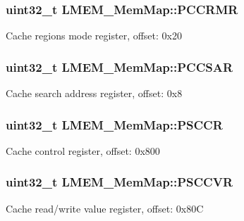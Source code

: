 \subsubsection[{P\+C\+C\+R\+M\+R}]{\setlength{\rightskip}{0pt plus 5cm}uint32\+\_\+t L\+M\+E\+M\+\_\+\+Mem\+Map\+::\+P\+C\+C\+R\+M\+R}\label{struct_l_m_e_m___mem_map_afd9bb5dd96464953c7be37e55627192e}
Cache regions mode register, offset\+: 0x20 \hypertarget{struct_l_m_e_m___mem_map_a2580365cbac4d397893ac168db87fa4d}{}
\subsubsection[{P\+C\+C\+S\+A\+R}]{\setlength{\rightskip}{0pt plus 5cm}uint32\+\_\+t L\+M\+E\+M\+\_\+\+Mem\+Map\+::\+P\+C\+C\+S\+A\+R}\label{struct_l_m_e_m___mem_map_a2580365cbac4d397893ac168db87fa4d}
Cache search address register, offset\+: 0x8 \hypertarget{struct_l_m_e_m___mem_map_ad26f05e85cf69da9518f970a37bf8c39}{}
\subsubsection[{P\+S\+C\+C\+R}]{\setlength{\rightskip}{0pt plus 5cm}uint32\+\_\+t L\+M\+E\+M\+\_\+\+Mem\+Map\+::\+P\+S\+C\+C\+R}\label{struct_l_m_e_m___mem_map_ad26f05e85cf69da9518f970a37bf8c39}
Cache control register, offset\+: 0x800 \hypertarget{struct_l_m_e_m___mem_map_a4d271cf6da70b234d27d64eae216d3b7}{}
\subsubsection[{P\+S\+C\+C\+V\+R}]{\setlength{\rightskip}{0pt plus 5cm}uint32\+\_\+t L\+M\+E\+M\+\_\+\+Mem\+Map\+::\+P\+S\+C\+C\+V\+R}\label{struct_l_m_e_m___mem_map_a4d271cf6da70b234d27d64eae216d3b7}
Cache read/write value register, offset\+: 0x80\+C \hypertarget{struct_l_m_e_m___mem_map_a9002773a5254b5d1ebb9a46218ef21c4}{}
